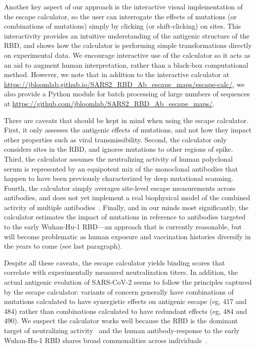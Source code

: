 \documentclass[9pt,twocolumn,twoside]{gsajnl_modified}
\begin{document}
Another key aspect of our approach is the interactive visual implementation of the escape calculator, so the user can interrogate the effects of mutations (or combinations of mutations) simply by clicking (or shift-clicking) on sites.
This interactivity provides an intuitive understanding of the antigenic structure of the RBD, and shows how the calculator is performing simple transformations directly on experimental data.
We encourage interactive use of the calculator so it acts as an aid to augment human interpretation, rather than a black-box computational method.
However, we note that in addition to the interactive calculator at \url{https://jbloomlab.github.io/SARS2_RBD_Ab_escape_maps/escape-calc/}, we also provide a Python module for batch processing of large numbers of sequences at \url{https://github.com/jbloomlab/SARS2_RBD_Ab_escape_maps/}.

There are caveats that should be kept in mind when using the escape calculator.
First, it only assesses the antigenic effects of mutations, and not how they impact other properties such as viral transmissibility.
Second, the calculator only considers sites in the RBD, and ignores mutations to other regions of spike.
Third, the calculator assumes the neutralizing activity of human polyclonal serum is represented by an equipotent mix of the monoclonal antibodies that happen to have been previously characterized by deep mutational scanning.
Fourth, the calculator simply averages site-level escape measurements across antibodies, and does not yet implement a real biophysical model of the combined activity of multiple antibodies~\citep{einav2020two}.
Finally, and in our minds most significantly, the calculator estimates the impact of mutations in reference to antibodies targeted to the early Wuhan-Hu-1 RBD---an approach that is currently reasonable, but will become problematic as human exposure and vaccination histories diversify in the years to come (see last paragraph).

Despite all these caveats, the escape calculator yields binding scores that correlate with experimentally measured neutralization titers.
In addition, the actual antigenic evolution of SARS-CoV-2 seems to follow the principles captured by the escape calculator: variants of concern generally have combinations of mutations calculated to have synergistic effects on antigenic escape (eg, 417 and 484) rather than combinations calculated to have redundant effects (eg, 484 and 490).
We suspect the calculator works well because the RBD is the dominant target of neutralizing activity~\citep{piccoli2020mapping,greaney2021comprehensive,schmidt2021high} and the human antibody-response to the early Wuhan-Hu-1 RBD shares broad commonalities across individuals~\citep{yuan2020structural,robbiani2020convergent,greaney2021comprehensive,greaney2021mapping,chen2021convergent}.
\end{document}

